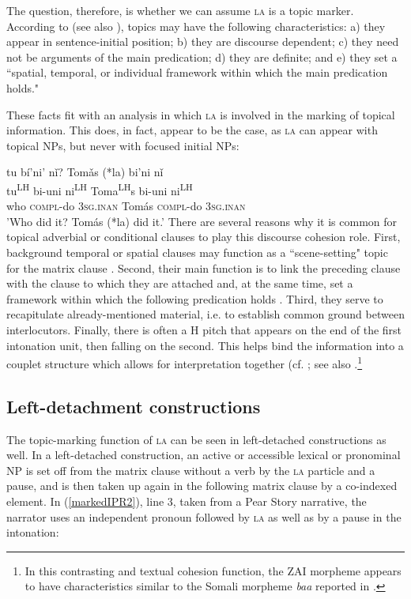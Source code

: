 The question, therefore, is whether we can assume \textsc{la} is a topic marker. According to \citet[50]{chafe1976} (see also \citealt{li1976}), topics may have the following characteristics: a) they appear in sentence-initial position; b) they are discourse dependent; c) they need not be arguments of the main predication; d) they are definite; and e) they set a ``spatial, temporal, or individual framework within which the main predication holds." 

These facts fit with an analysis in which \textsc{la} is involved in the marking of topical information. This does, in fact, appear to be the case, as \textsc{la} can appear with topical NPs, but never with focused initial NPs:

\ea
{}tu b\'{i}'ni' n\v{i}? Tom\v{a}s (*la) bi'ni n\v{i} \\
tu\textsuperscript{LH} bi-uni ni\textsuperscript{LH} Toma\textsuperscript{LH}s { } bi-uni ni\textsuperscript{LH}  \\
who \textsc{compl}-do 3\textsc{sg.inan} Tom\'{a}s { } \textsc{compl}-do 3\textsc{sg.inan}  \\
\glt 'Who did it? Tom\'{a}s (*la) did it.'
\z
There are several reasons why it is common for topical adverbial or conditional clauses to play this discourse cohesion role. First, background temporal or spatial clauses may function as a ``scene-setting" topic for the matrix clause \citep[125]{lambrecht1994}. Second, their main function is to link the preceding clause with the clause to which they are attached and, at the same time, set a framework within which the following predication holds \citep[294]{thompson2007}. Third, they serve to recapitulate already-mentioned material, i.e. to establish common ground between interlocutors. Finally, there is often a H pitch that appears on the end of the first intonation unit, then falling on the second. This helps bind the information into a couplet structure which allows for interpretation together (cf. ; see also \citet[126-7]{sicoli2007}.\footnote{In this contrasting and textual cohesion function, the ZAI morpheme appears to have characteristics similar to the Somali morpheme  \textit{baa} reported in \citet[138-140]{matic2013}.}


\subsection{Left-detachment constructions}

The topic-marking function of \textsc{la} can be seen in left-detached constructions as well. In a left-detached construction, an active or accessible lexical or pronominal NP is set off from the matrix clause without a verb by the \textsc{la} particle and a pause, and is then taken up again in the following matrix clause by a co-indexed element. In (\ref{markedIPR2}), line 3, taken from a Pear Story narrative, the narrator uses an independent pronoun followed by \textsc{la} as well as by a pause in the intonation: 

